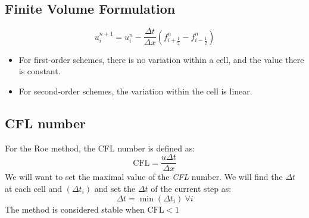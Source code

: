 \documentclass[11pt, a4paper]{article}
\begin{document}
\subsection{Finite Volume Formulation}
\begin{equation}
    u_i^{n+1}=u_i^n-\frac{\Delta t}{\Delta x}\left(f_{i+\frac{1}{2}}^n-f_{i-\frac{1}{2}}^n\right)
\end{equation}
\begin{itemize}
    \item For first-order schemes, there is no variation within a cell, and the value there is constant.
    \item For second-order schemes, the variation within the cell is linear. 
\end{itemize}

\subsection{CFL number}
For the Roe method, the CFL number is defined as:
\begin{equation}
    \mathrm{CFL}=\frac{u\Delta t}{\Delta x}
\end{equation}
We will want to set the maximal value of the \emph{CFL} number. We will find the $\Delta t$ at each cell and $\left(\Delta t_i\right)$ and set the $\Delta t$ of the current step as:
\begin{equation}
    \Delta t=\min\left(\Delta t_i\right)\ \forall i
\end{equation}
The method is considered stable when $\mathrm{CFL<1}$
\end{document}
